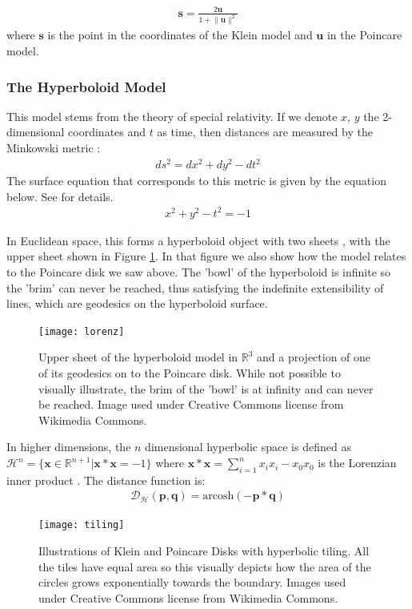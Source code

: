 \documentclass[12pt]{report}
\begin{document}
\begin{align}
  \mathbf{s} = \frac{2\mathbf{u}}{1 + \lVert \mathbf{u} \rVert^2}
  \label{eq:p2k}
\end{align}
where $\mathbf{s}$ is the point in the coordinates of the Klein model and $\mathbf{u}$ in the Poincare model.

\subsubsection{The Hyperboloid Model}
This model stems from the theory of special relativity. If we denote $x$, $y$ the 2-dimensional coordinates and $t$ as time, then distances are measured by the Minkowski metric \cite{Greenberg1994}:
\begin{align*}
  ds^2 = dx^2 + dy^2 - dt^2
\end{align*}
The surface equation that corresponds to this metric is given by the equation below. See \cite{Greenberg1994} for details.
\begin{align*}
  x^2 + y^2 - t^2 = -1 
\end{align*}

In Euclidean space, this forms a hyperboloid object with two sheets \cite{Greenberg1994}, with the upper sheet shown in Figure \ref{fig:lorenz}. In that figure we also show how the model relates to the Poincare disk we saw above. The 'bowl' of the hyperboloid is infinite so the 'brim' can never be reached, thus satisfying the indefinite extensibility of lines, which are geodesics on the hyperboloid surface.
\begin{figure}
  \centering
	\texttt{[image: lorenz]}
	\caption{Upper sheet of the hyperboloid model in $\mathbb{R}^3$ and a projection of one of its geodesics on to the Poincare disk. While not possible to visually illustrate, the brim of the 'bowl' is at infinity and can never be reached. Image used under Creative Commons license from Wikimedia Commons.}
	\label{fig:lorenz}
\end{figure}
In higher dimensions, the $n$ dimensional hyperbolic space is defined as $\mathcal{H}^n = \{\mathbf{x} \in \mathbb{R}^{n+1} | \mathbf{x} * \mathbf{x}=-1 \}$ where $\mathbf{x} * \mathbf{x} = \sum_{i=1}^n x_i x_i - x_0 x_0$ is the Lorenzian inner product \cite{Nickel2018} \cite{Cannon}. The distance function is:
\begin{align}
  \mathcal{D_H(\mathbf{p}, \mathbf{q})} = \text{arcosh}(-\mathbf{p} * \mathbf{q})
\end{align}

\begin{figure}
  \centering
	\texttt{[image: tiling]}
	\caption{Illustrations of Klein and Poincare Disks with hyperbolic tiling. All the tiles have equal area so this visually depicts how the area of the circles grows exponentially towards the boundary. Images used under Creative Commons license from Wikimedia Commons.}
	\label{fig:hyspace}
\end{figure}
\end{document}
